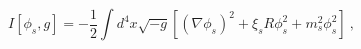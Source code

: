 \begin{equation}\label{1.8}
I[\phi_s, g]=-\frac 12 \int d^4x \sqrt{-g} \left[(\nabla \phi_s)^2+
\xi_s R\phi_s^2+m_s^2\phi_s^2\right]~,
\end{equation}

